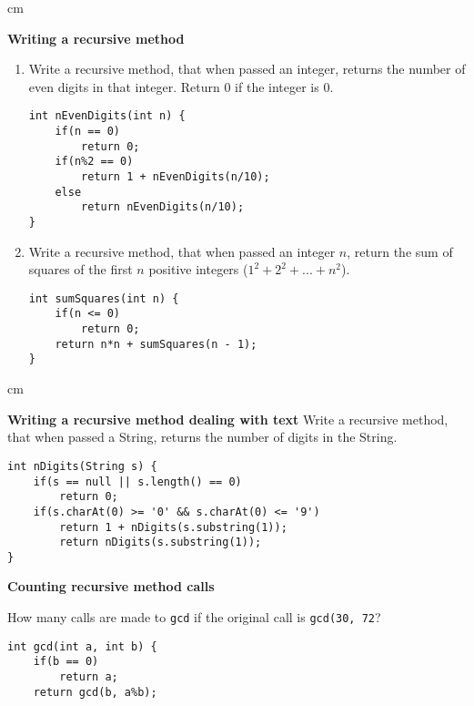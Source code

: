 \begin{questions}
 cm

\question  \textbf{Writing a recursive method} \vskip 0.5cm

\begin{enumerate}
  \item Write a recursive method, that when passed an integer, returns the number of even digits in that integer. Return 0 if the integer is 0.

\begin{solution}
\begin{lstlisting}
int nEvenDigits(int n) {
	if(n == 0)
		return 0;
	if(n%2 == 0)
		return 1 + nEvenDigits(n/10);
	else
		return nEvenDigits(n/10);
}
\end{lstlisting}	
\end{solution}

\item Write a recursive method, that when passed an integer $n$, return the sum of squares of the first $n$ positive integers  ($1^2 + 2^2 + ... + n^2$).

\begin{solution}
\begin{lstlisting}
int sumSquares(int n) {
	if(n <= 0)
		return 0;
	return n*n + sumSquares(n - 1);
}
\end{lstlisting}	
\end{solution}
\end{enumerate}
 cm

\question  \textbf{Writing a recursive method dealing with text} \vskip 0.5cm
Write a recursive method, that when passed a String, returns the number of digits in the String.

\begin{solution}
\begin{lstlisting}
int nDigits(String s) {
	if(s == null || s.length() == 0)
		return 0;
	if(s.charAt(0) >= '0' && s.charAt(0) <= '9')
		return 1 + nDigits(s.substring(1));
		return nDigits(s.substring(1));	
}
\end{lstlisting}	
\end{solution}

\question  \textbf{Counting recursive method calls} \vskip 0.5cm

How many calls are made to \texttt{gcd} if the original call is \texttt{gcd(30, 72}?

\begin{lstlisting}
int gcd(int a, int b) {
	if(b == 0)
		return a;
	return gcd(b, a%b);
\end{lstlisting}


\end{questions}
